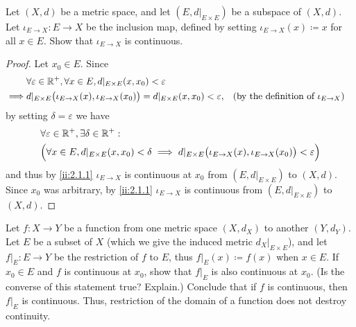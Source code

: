 \begin{ex}\label{ii:ex:2.1.5}
  Let \((X, d)\) be a metric space, and let \((E, d|_{E \times E})\) be a subspace of \((X, d)\).
  Let \(\iota_{E \to X} : E \to X\) be the inclusion map, defined by setting \(\iota_{E \to X}(x) \coloneqq x\) for all \(x \in E\).
  Show that \(\iota_{E \to X}\) is continuous.
\end{ex}

\begin{proof}
  Let \(x_0 \in E\).
  Since
  \begin{align*}
             & \forall \varepsilon \in \mathbb{R}^+, \forall x \in E, d|_{E \times E}(x, x_0) < \varepsilon                                                                              \\
    \implies & d|_{E \times E}\big(\iota_{E \to X}(x), \iota_{E \to X}(x_0)\big) = d|_{E \times E}(x, x_0) < \varepsilon, &  & \text{(by the definition of \(\iota_{E \to X}\))}
  \end{align*}
  by setting \(\delta = \varepsilon\) we have
  \begin{align*}
     & \forall \varepsilon \in \mathbb{R}^+, \exists \delta \in \mathbb{R}^+ :                                                                                              \\
     & \Big(\forall x \in E, d|_{E \times E}(x, x_0) < \delta \implies d|_{E \times E}\big(\iota_{E \to X}(x), \iota_{E \to X}(x_0)\big) < \varepsilon\Big)
  \end{align*}
  and thus by \cref{ii:2.1.1} \(\iota_{E \to X}\) is continuous at \(x_0\) from \((E, d|_{E \times E})\) to \((X, d)\).
  Since \(x_0\) was arbitrary, by \cref{ii:2.1.1} \(\iota_{E \to X}\) is continuous from \((E, d|_{E \times E})\) to \((X, d)\).
\end{proof}

\begin{ex}\label{ii:ex:2.1.6}
  Let \(f : X \to Y\) be a function from one metric space \((X, d_X)\) to another \((Y, d_Y)\).
  Let \(E\) be a subset of \(X\) (which we give the induced metric \(d_X|_{E \times E}\)), and let \(f|_E : E \to Y\) be the restriction of \(f\) to \(E\), thus \(f|_E(x) \coloneqq f(x)\) when \(x \in E\).
  If \(x_0 \in E\) and \(f\) is continuous at \(x_0\), show that \(f|_E\) is also continuous at \(x_0\).
  (Is the converse of this statement true? Explain.)
  Conclude that if \(f\) is continuous, then \(f|_E\) is continuous.
  Thus, restriction of the domain of a function does not destroy continuity.
\end{ex}

